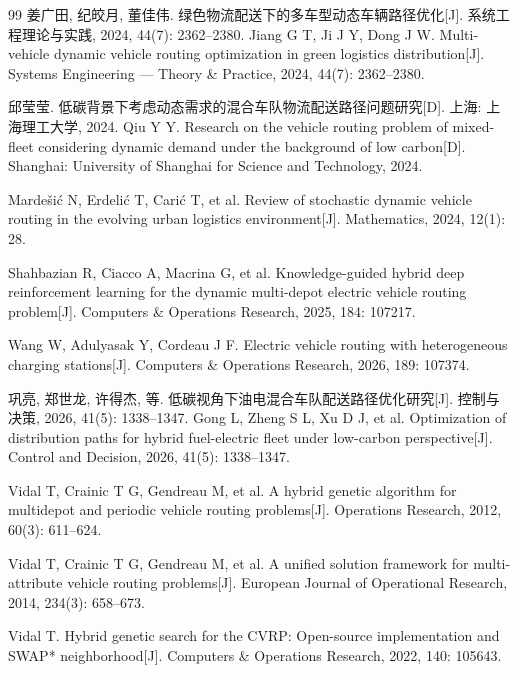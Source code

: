 \begin{thebibliography}{99}
 姜广田, 纪皎月, 董佳伟. 绿色物流配送下的多车型动态车辆路径优化[J]. 系统工程理论与实践, 2024, 44(7): 2362--2380.\newline
Jiang G T, Ji J Y, Dong J W. Multi-vehicle dynamic vehicle routing optimization in green logistics distribution[J]. Systems Engineering --- Theory \& Practice, 2024, 44(7): 2362--2380.

 邱莹莹. 低碳背景下考虑动态需求的混合车队物流配送路径问题研究[D]. 上海: 上海理工大学, 2024.\newline
Qiu Y Y. Research on the vehicle routing problem of mixed-fleet considering dynamic demand under the background of low carbon[D]. Shanghai: University of Shanghai for Science and Technology, 2024.

 Marde\v{s}i\'{c} N, Erdeli\'{c} T, Cari\'{c} T, et al. Review of stochastic dynamic vehicle routing in the evolving urban logistics environment[J]. Mathematics, 2024, 12(1): 28.

 Shahbazian R, Ciacco A, Macrina G, et al. Knowledge-guided hybrid deep reinforcement learning for the dynamic multi-depot electric vehicle routing problem[J]. Computers \& Operations Research, 2025, 184: 107217.

 Wang W, Adulyasak Y, Cordeau J F. Electric vehicle routing with heterogeneous charging stations[J]. Computers \& Operations Research, 2026, 189: 107374.

 巩亮, 郑世龙, 许得杰, 等. 低碳视角下油电混合车队配送路径优化研究[J]. 控制与决策, 2026, 41(5): 1338--1347.\newline
Gong L, Zheng S L, Xu D J, et al. Optimization of distribution paths for hybrid fuel-electric fleet under low-carbon perspective[J]. Control and Decision, 2026, 41(5): 1338--1347.

 Vidal T, Crainic T G, Gendreau M, et al. A hybrid genetic algorithm for multidepot and periodic vehicle routing problems[J]. Operations Research, 2012, 60(3): 611--624.

 Vidal T, Crainic T G, Gendreau M, et al. A unified solution framework for multi-attribute vehicle routing problems[J]. European Journal of Operational Research, 2014, 234(3): 658--673.

 Vidal T. Hybrid genetic search for the CVRP: Open-source implementation and SWAP* neighborhood[J]. Computers \& Operations Research, 2022, 140: 105643.


\end{thebibliography}
